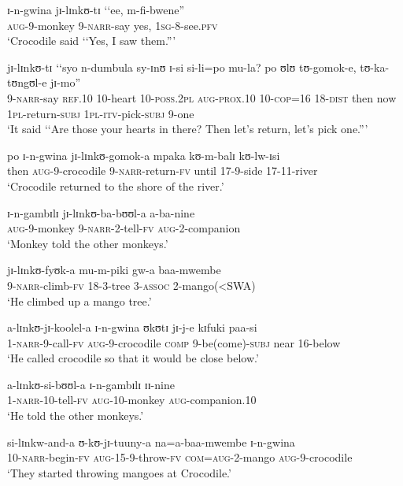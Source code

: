 \begin{exe}
\ex \gll ɪ-n-gwina jɪ-lɪnkʊ-tɪ \lq\lq ee, m-fi-bwene''\\
\textsc{aug}-9-monkey 9-\textsc{narr}-say \phantom{\lq\lq}yes, \textsc{1sg}-8-see.\textsc{pfv}\\
\glt \lq Crocodile said \lq\lq Yes, I saw them.''{}'

\ex \gll jɪ-lɪnkʊ-tɪ \lq\lq syo n-dumbula sy-ɪnʊ ɪ-si si-li=po mu-la? po ʊlʊ tʊ-gomok-e, tʊ-ka-tʊngʊl-e jɪ-mo''\\
9-\textsc{narr}-say \phantom{\lq\lq}\textsc{ref.10} 10-heart 10-\textsc{poss.2pl} \textsc{aug}-\textsc{prox.10} 10-\textsc{cop}=16 18-\textsc{dist} then now \textsc{1pl}-return-\textsc{subj} \textsc{1pl}-\textsc{itv}-pick-\textsc{subj} 9-one\\
\glt \lq It said \lq\lq Are those your hearts in there? Then let's return, let's pick one.''{}'

\ex \gll po ɪ-n-gwina jɪ-lɪnkʊ-gomok-a mpaka kʊ-m-balɪ kʊ-lw-ɪsi\\
then \textsc{aug}-9-crocodile 9-\textsc{narr}-return-\textsc{fv} until 17-9-side 17-11-river\\
\glt \lq Crocodile returned to the shore of the river.'

\ex \gll ɪ-n-gambɪlɪ jɪ-lɪnkʊ-ba-bʊʊl-a a-ba-nine\\
\textsc{aug}-9-monkey 9-\textsc{narr}-2-tell-\textsc{fv} \textsc{aug}-2-companion\\
\glt \lq Monkey told the other monkeys.'

\ex \gll jɪ-lɪnkʊ-fyʊk-a mu-m-piki gw-a baa-mwembe\\
9-\textsc{narr}-climb-\textsc{fv} 18-3-tree 3-\textsc{assoc} 2-mango(<SWA)\\
\glt \lq He climbed up a mango tree.'

\ex \gll a-lɪnkʊ-jɪ-koolel-a ɪ-n-gwina ʊkʊtɪ jɪ-j-e kɪfuki paa-si\\
1-\textsc{narr}-9-call-\textsc{fv} \textsc{aug}-9-crocodile \textsc{comp} 9-be(come)-\textsc{subj} near 16-below\\
\glt \lq He called crocodile so that it would be close below.'

\ex \gll a-lɪnkʊ-si-bʊʊl-a ɪ-n-gambɪlɪ ɪɪ-nine\\
1-\textsc{narr}-10-tell-\textsc{fv} \textsc{aug}-10-monkey \textsc{aug}-companion.10\\
\glt \lq He told the other monkeys.'

\ex \gll si-lɪnkw-and-a ʊ-kʊ-jɪ-tuuny-a na=a-baa-mwembe ɪ-n-gwina\\
10-\textsc{narr}-begin-\textsc{fv} \textsc{aug}-15-9-throw-\textsc{fv} \textsc{com}=\textsc{aug}-2-mango \textsc{aug}-9-crocodile\\
\glt \lq They started throwing mangoes at Crocodile.'


\end{exe}
